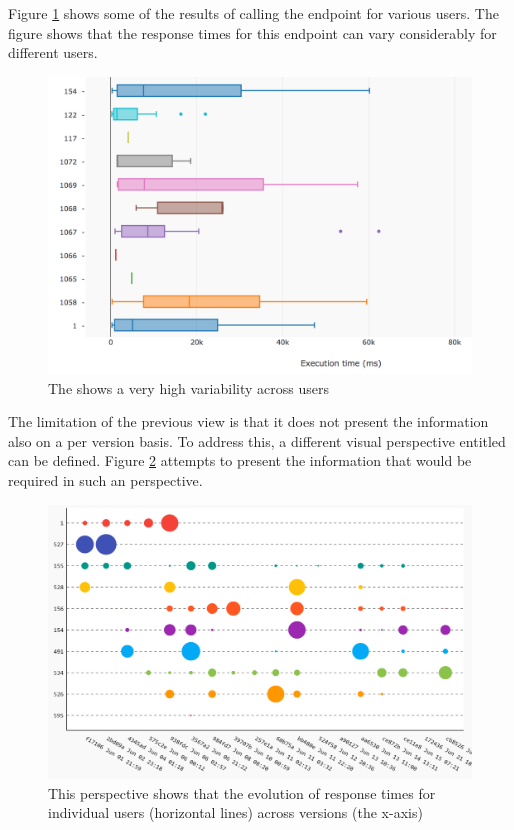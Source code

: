 \documentclass[conference]{IEEEtran}
\begin{document}
  Figure \ref{fig:tpu} shows some of the results of calling the \epFeedItems endpoint for various users. The figure shows that the response times for this endpoint can vary considerably for different users. 

  \begin{figure}[!ht]
    \centering
    \includegraphics[width=\linewidth]{time_per_user}
    \caption{The \epFeedItems shows a very high variability across users}
    \label{fig:tpu}
  \end{figure}

  \newpage
  \niceseparator

  The limitation of the previous view is that it does not present the information also on a per version basis. To address this, a different visual perspective entitled  can be defined. Figure \ref{fig:tuv} attempts to present the information that would be required in such an perspective. 

  \begin{figure}[!ht]
    \centering
    \includegraphics[width=\linewidth]{time_per_user_per_version}
    \caption{This perspective shows that the evolution of response times for individual users (horizontal lines) across versions (the x-axis)}
    \label{fig:tuv}
  \end{figure}
\end{document}
